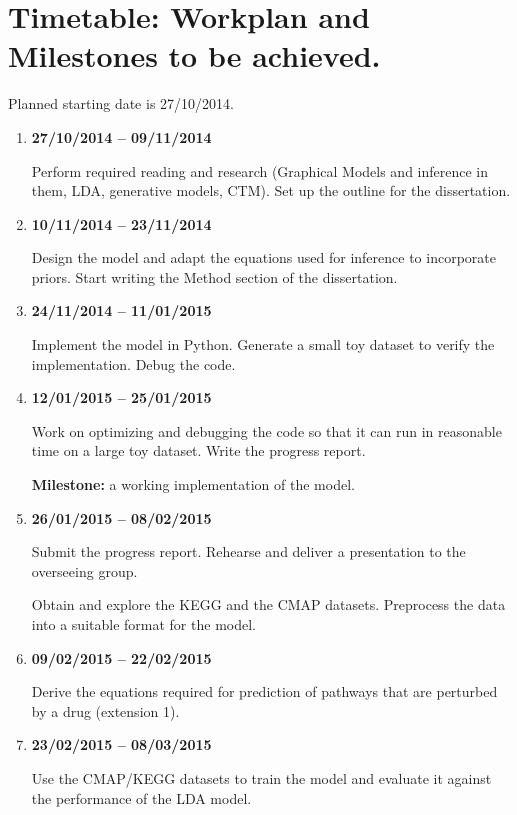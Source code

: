 \documentclass[12pt,a4]{article}
\begin{document}
\section*{Timetable: Workplan and Milestones to be achieved.}

Planned starting date is 27/10/2014.

\begin{enumerate}

\item {\bf 27/10/2014 -- 09/11/2014} 

Perform required reading and research (Graphical Models and inference in them, LDA, generative models, CTM). Set up the outline for the dissertation.

\item {\bf 10/11/2014 -- 23/11/2014} 

Design the model and adapt the equations used for inference to incorporate priors. Start writing the Method section of the dissertation.

\item {\bf 24/11/2014 -- 11/01/2015} 

Implement the model in Python. Generate a small toy dataset to verify the implementation. Debug the code.

\item {\bf 12/01/2015 -- 25/01/2015}

Work on optimizing and debugging the code so that it can run in reasonable time on a large toy dataset. Write the progress report. 

\textbf{Milestone:} a working implementation of the model. 

\item {\bf 26/01/2015 -- 08/02/2015} 

Submit the progress report. Rehearse and deliver a presentation to the overseeing group.

Obtain and explore the KEGG and the CMAP datasets. Preprocess the data into a suitable format for the model.

\item {\bf 09/02/2015 -- 22/02/2015}

Derive the equations required for prediction of pathways that are perturbed by a drug (extension 1).

\item {\bf 23/02/2015 -- 08/03/2015}

Use the CMAP/KEGG datasets to train the model and evaluate it against the performance of the LDA model.


\end{enumerate}
\end{document}
